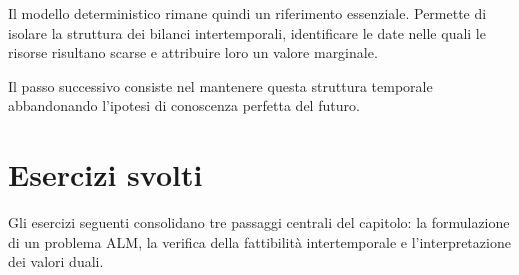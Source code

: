 Il modello deterministico rimane quindi un riferimento essenziale. Permette
di isolare la struttura dei bilanci intertemporali, identificare le date nelle
quali le risorse risultano scarse e attribuire loro un valore marginale.

Il passo successivo consiste nel mantenere questa struttura temporale
abbandonando l'ipotesi di conoscenza perfetta del futuro.

\section{Esercizi svolti}

\label{sec:cap12-esercizi-svolti}

Gli esercizi seguenti consolidano tre passaggi centrali del capitolo:
la formulazione di un problema ALM, la verifica della fattibilit\`a
intertemporale e l'interpretazione dei valori duali.

